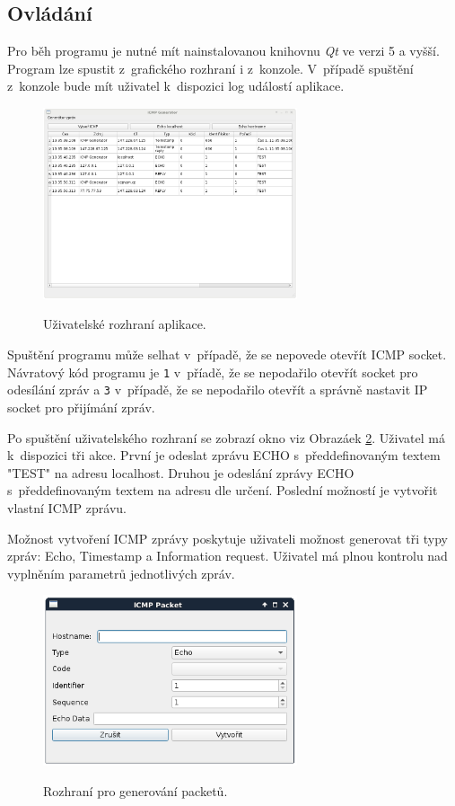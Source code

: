 \documentclass[12pt, a4paper]{article}
\begin{document}
\subsection{Ovládání}

Pro běh programu je nutné mít nainstalovanou knihovnu \emph{Qt} ve verzi 5 a vyšší. Program lze spustit z~grafického rozhraní i z~konzole. V~případě spuštění z~konzole bude mít uživatel k~dispozici log událostí aplikace.

\begin{figure}[h!]
\centering
\includegraphics[bb= 0 0 820 445 , width=75mm]{gui.png}
\label{gui}
\caption{Uživatelské rozhraní aplikace.}
\end{figure}

Spuštění programu může selhat v~případě, že se nepovede otevřít ICMP socket. Návratový kód programu je \texttt{1} v~příadě, že se nepodařilo otevřít socket pro odesílání zpráv a \texttt{3} v~případě, že se nepodařilo otevřít a správně nastavit IP socket pro přijímání zpráv.

Po spuštění uživatelského rozhraní se zobrazí okno viz Obrazáek \ref{gui}. Uživatel má k~dispozici tři akce. První je odeslat zprávu ECHO s~předdefinovaným textem "TEST" na adresu localhost. Druhou je odeslání zprávy ECHO s~předdefinovaným textem na adresu dle určení. Poslední možností je vytvořit vlastní ICMP zprávu.

Možnost vytvoření ICMP zprávy poskytuje uživateli možnost generovat tři typy zpráv: Echo, Timestamp a Information request. Uživatel má plnou kontrolu nad vyplněním parametrů jednotlivých zpráv.

\begin{figure}[h!]
\centering
\includegraphics[bb= 0 0 820 445 , width=75mm]{gui2.png}
\label{gui}
\caption{Rozhraní pro generování packetů.}
\end{figure}
\end{document}

